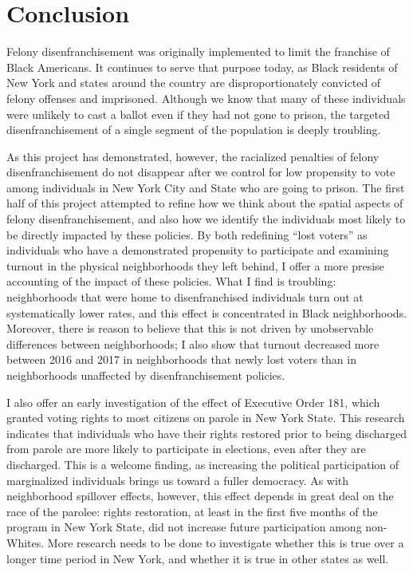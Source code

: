 \documentclass[12pt,]{article}
\begin{document}
\hypertarget{conclusion}{%
\section{Conclusion}\label{conclusion}}

Felony disenfranchisement was originally implemented to limit the franchise of Black Americans. It continues to serve that purpose today, as Black residents of New York and states around the country are disproportionately convicted of felony offenses and imprisoned. Although we know that many of these individuals were unlikely to cast a ballot even if they had not gone to prison, the targeted disenfranchisement of a single segment of the population is deeply troubling.

As this project has demonstrated, however, the racialized penalties of felony disenfranchisement do not disappear after we control for low propensity to vote among individuals in New York City and State who are going to prison. The first half of this project attempted to refine how we think about the spatial aspects of felony disenfranchisement, and also how we identify the individuals most likely to be directly impacted by these policies. By both redefining ``lost voters'' as individuals who have a demonstrated propensity to participate and examining turnout in the physical neighborhoods they left behind, I offer a more presise accounting of the impact of these policies. What I find is troubling: neighborhoods that were home to disenfranchised individuals turn out at systematically lower rates, and this effect is concentrated in Black neighborhoods. Moreover, there is reason to believe that this is not driven by unobservable differences between neighborhoods; I also show that turnout decreased more between 2016 and 2017 in neighborhoods that newly lost voters than in neighborhoods unaffected by disenfranchisement policies.

I also offer an early investigation of the effect of Executive Order 181, which granted voting rights to most citizens on parole in New York State. This research indicates that individuals who have their rights restored prior to being discharged from parole are more likely to participate in elections, even after they are discharged. This is a welcome finding, as increasing the political participation of marginalized individuals brings us toward a fuller democracy. As with neighborhood spillover effects, however, this effect depends in great deal on the race of the parolee: rights restoration, at least in the first five months of the program in New York State, did not increase future participation among non-Whites. More research needs to be done to investigate whether this is true over a longer time period in New York, and whether it is true in other states as well.
\end{document}
